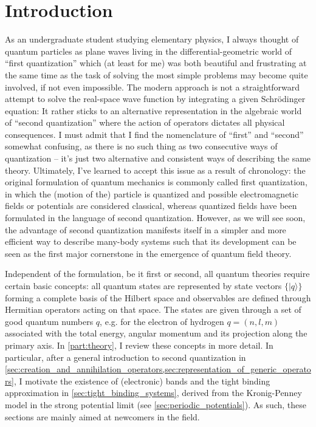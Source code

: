 %
\chapter*{Introduction}
%
As an undergraduate student studying elementary physics, I always thought of quantum particles as plane waves living in the differential-geometric world of ``first quan\-ti\-zation'' which (at least for me) was both beautiful and frustrating at the same time as the task of solving the most simple problems may become quite involved, if not even impossible.
The modern approach is not a straightforward attempt to solve the real-space wave function by integrating a given Schrödinger equation: It rather sticks to an alternative representation in the algebraic world of ``second quantization'' where the action of operators dictates all physical consequences.
I must admit that I find the nomenclature of ``first'' and ``second'' somewhat confusing, as there is no such thing as two consecutive ways of quantization -- it's just two alternative and consistent ways of describing the same theory.
Ultimately, I've learned to accept this issue as a result of chronology: the original formulation of quantum mechanics is commonly called first quantization, in which the (motion of the) particle is quantized and possible electromagnetic fields or potentials are considered classical, whereas quantized fields have been formulated in the language of second quantization.
However, as we will see soon, the advantage of second quantization manifests itself in a simpler and more efficient way to describe many-body systems such that its development can be seen as the first major cornerstone in the emergence of quantum field theory.

Independent of the formulation, be it first or second, all quantum theories require certain basic concepts:
all quantum states are represented by state vectors $\{|q\rangle\}$ forming a complete basis of the Hilbert space and observables are defined through Hermitian operators acting on that space.
The states are given through a set of good quantum numbers $q$, e.g. for the electron of hydrogen $q=(n,l,m)$ associated with the total energy, angular momentum and its projection along the primary axis.
In \cref{part:theory}, I review these concepts in more detail.
In particular, after a general introduction to second quantization in \cref{sec:creation_and_annihilation_operators,sec:representation_of_generic_operators}, I motivate the existence of (electronic) bands and the tight binding approximation in \cref{sec:tight_binding_systems}, derived from the Kronig-Penney model in the strong potential limit (see \cref{sec:periodic_potentials}).
As such, these sections are mainly aimed at newcomers in the field.

